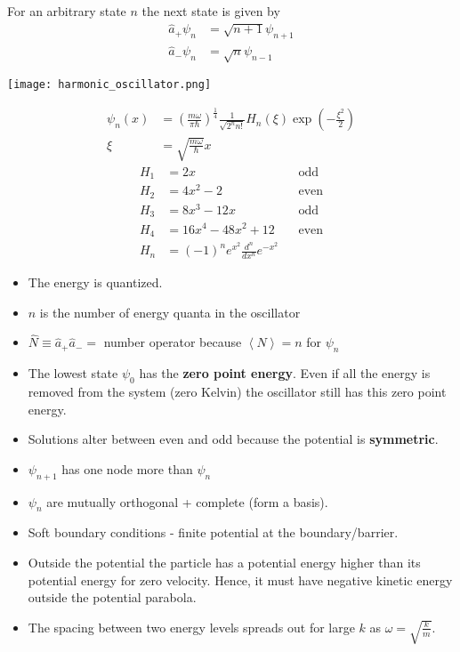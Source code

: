 For an arbitrary state $n$ the next state is given by
\begin{align*}
    \widehat{a}_{+}\psi_n & = \sqrt{n+1}\psi_{n+1} \\
    \widehat{a}_{-}\psi_n & = \sqrt{n}\psi_{n-1}
\end{align*}

\texttt{[image: harmonic\_oscillator.png]}


\noindent\begin{align*}
    \psi_n(x) & ={\left(\frac{m\omega}{\pi\hbar}\right)}^{\frac{1}{4}}\frac{1}{\sqrt{2^n n!}}H_n(\xi)\exp\left(-\frac{\xi^2}{2}\right) \\
    \xi       & =\sqrt{\frac{m\omega}{\hbar}}x
\end{align*}
{\tiny\noindent\begin{align*}
    H_1 & = 2x                                         &  & \text{odd}  \\
    H_2 & = 4x^2-2                                     &  & \text{even} \\
    H_3 & = 8x^3-12x                                   &  & \text{odd}  \\
    H_4 & = 16x^4-48x^2+12                             &  & \text{even} \\
    H_n & = {(-1)}^n e^{x^2} \frac{d^n}{dx^n} e^{-x^2}
\end{align*}
}

\begin{itemize}
    \item The energy is quantized.
    \item $n$ is the number of energy quanta in the oscillator
    \item $\widehat{N} \equiv \widehat{a}_{+}\widehat{a}_{-} = $ number operator because $\left<N\right> = n$ for $\psi_n$
    \item The lowest state $\psi_0$ has the \textbf{zero point energy}. Even if all the energy is removed from the system (zero Kelvin) the oscillator still has this zero point energy.
    \item Solutions alter between even and odd because the potential is \textbf{symmetric}.
    \item $\psi_{n+1}$ has one node more than $\psi_n$
    \item $\psi_n$ are mutually orthogonal + complete (form a basis).
    \item Soft boundary conditions - finite potential at the boundary/barrier.
    \item Outside the potential the particle has a potential energy higher than its potential energy for zero velocity. Hence, it must have negative kinetic energy outside the potential parabola.
    \item The spacing between two energy levels spreads out for large $k$ as $\omega=\sqrt{\frac{k}{m}}$.
\end{itemize}

